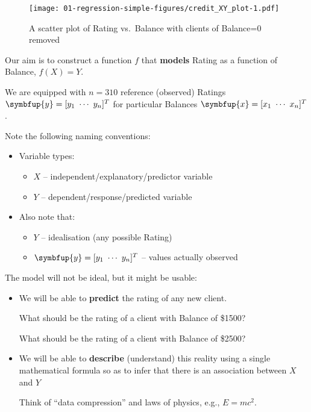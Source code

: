 \documentclass[10pt,b5paper,krantz1]{krantz}
\renewcommand{\mathbf}[1]{\symbfup{#1}}
\begin{document}
\begin{figure}
\hypertarget{fig:credit_XY_plot}{%
\centering
\texttt{[image: 01-regression-simple-figures/credit\_XY\_plot-1.pdf]}
\caption{A scatter plot of Rating vs.~Balance with clients of Balance=0 removed}\label{fig:credit_XY_plot}
}
\end{figure}

Our aim is to construct a function \(f\) that
\textbf{models} Rating as a function of Balance,
\(f(X)=Y\).

We are equipped with \(n=310\) reference (observed) Ratings
\(\mathbf{y}=[y_1\ \cdots\ y_n]^T\)
for particular Balances \(\mathbf{x}=[x_1\ \cdots\ x_n]^T\).

Note the following naming conventions:

\begin{itemize}
\item
  Variable types:

  \begin{itemize}
  \item
    \(X\) -- independent/explanatory/predictor variable
  \item
    \(Y\) -- dependent/response/predicted variable
  \end{itemize}
\item
  Also note that:

  \begin{itemize}
  \item
    \(Y\) -- idealisation (any possible Rating)
  \item
    \(\mathbf{y}=[y_1\ \cdots\ y_n]^T\) -- values actually observed
  \end{itemize}
\end{itemize}

The model will not be ideal, but it might be usable:

\begin{itemize}
\item
  We will be able to \textbf{predict} the rating of any new client.

  What should be the rating of a client with Balance of \$1500?

  What should be the rating of a client with Balance of \$2500?
\item
  We will be able to \textbf{describe} (understand) this reality using a single mathematical formula
  so as to infer that there is an association between \(X\) and \(Y\)

  Think of ``data compression'' and laws of physics, e.g., \(E=mc^2\).
\end{itemize}
\end{document}
